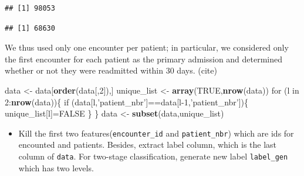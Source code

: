 \documentclass[]{article}
\newenvironment{Shaded}{\begin{snugshade}}{\end{snugshade}}
\newcommand{\KeywordTok}[1]{\textcolor[rgb]{0.13,0.29,0.53}{\textbf{{#1}}}}
\newcommand{\DecValTok}[1]{\textcolor[rgb]{0.00,0.00,0.81}{{#1}}}
\newcommand{\StringTok}[1]{\textcolor[rgb]{0.31,0.60,0.02}{{#1}}}
\newcommand{\OtherTok}[1]{\textcolor[rgb]{0.56,0.35,0.01}{{#1}}}
\newcommand{\NormalTok}[1]{{#1}}
\begin{document}
\begin{Shaded}
\end{Shaded}

\begin{verbatim}
## [1] 98053
\end{verbatim}

\begin{Shaded}
\end{Shaded}

\begin{verbatim}
## [1] 68630
\end{verbatim}

We thus used only one encounter per patient; in particular, we
considered only the first encounter for each patient as the primary
admission and determined whether or not they were readmitted within 30
days. (cite)

\begin{Shaded}
\begin{Highlighting}[]
\NormalTok{data <-}\StringTok{ }\NormalTok{data[}\KeywordTok{order}\NormalTok{(data[,}\DecValTok{2}\NormalTok{]),]}
\NormalTok{unique_list <-}\StringTok{ }\KeywordTok{array}\NormalTok{(}\OtherTok{TRUE}\NormalTok{,}\KeywordTok{nrow}\NormalTok{(data))}
\NormalTok{for (l in }\DecValTok{2}\NormalTok{:}\KeywordTok{nrow}\NormalTok{(data))\{}
    \NormalTok{if (data[l,}\StringTok{'patient_nbr'}\NormalTok{]==data[l}\DecValTok{-1}\NormalTok{,}\StringTok{'patient_nbr'}\NormalTok{])\{}
        \NormalTok{unique_list[l]=}\OtherTok{FALSE}
    \NormalTok{\}}
\NormalTok{\}}
\NormalTok{data <-}\StringTok{ }\KeywordTok{subset}\NormalTok{(data,unique_list)}
\end{Highlighting}
\end{Shaded}

\begin{itemize}
\itemsep1pt\parskip0pt
\item
  Kill the first two features(\texttt{encounter\_id} and
  \texttt{patient\_nbr}) which are ids for encounted and patients.
  Besides, extract label column, which is the last column of
  \texttt{data}. For two-stage classification, generate new label
  \texttt{label\_gen} which has two levels.
\end{itemize}
\end{document}
